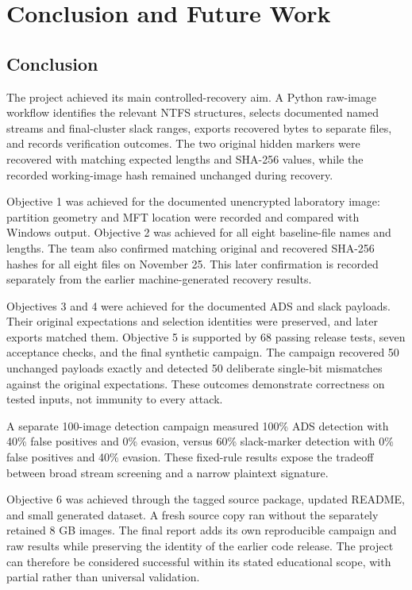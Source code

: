 \chapter{Conclusion and Future Work}
\section{Conclusion}
The project achieved its main controlled-recovery aim. A Python raw-image
workflow identifies the relevant NTFS structures, selects documented named
streams and final-cluster slack ranges, exports recovered bytes to separate
files, and records verification outcomes. The two original hidden markers
were recovered with matching expected lengths and SHA-256 values, while the
recorded working-image hash remained unchanged during recovery.

Objective 1 was achieved for the documented unencrypted laboratory image:
partition geometry and MFT location were recorded and compared with Windows
output. Objective 2 was achieved for all eight baseline-file names and lengths.
The team also confirmed matching original and recovered SHA-256 hashes
for all eight files on November 25. This later confirmation is recorded
separately from the earlier machine-generated recovery results.

Objectives 3 and 4 were achieved for the documented ADS and slack payloads.
Their original expectations and selection identities were preserved, and
later exports matched them. Objective 5 is supported by 68 passing release
tests, seven acceptance checks, and the final synthetic campaign. The
campaign recovered 50 unchanged payloads exactly and detected 50 deliberate
single-bit mismatches against the original expectations. These outcomes
demonstrate correctness on tested inputs, not immunity to every attack.

A separate 100-image detection campaign measured 100\% ADS detection with
40\% false positives and 0\% evasion, versus 60\% slack-marker detection with
0\% false positives and 40\% evasion. These fixed-rule results expose the
tradeoff between broad stream screening and a narrow plaintext signature.

Objective 6 was achieved through the tagged source package, updated README,
and small generated dataset. A fresh source copy ran without the separately
retained 8 GB images. The final report adds its own reproducible campaign
and raw results while preserving the identity of the earlier code release.
The project can therefore be considered successful within its stated
educational scope, with partial rather than universal validation.

